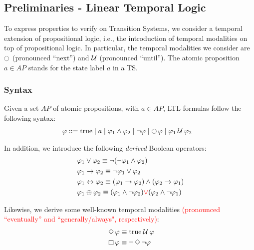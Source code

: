 \documentclass{article}
\begin{document}
\subsection{Preliminaries - Linear Temporal Logic}
\label{subsec-ltl}
To express properties to verify on Transition Systems, we consider a temporal extension of propositional logic, i.e., 
the introduction of temporal modalities on top of propositional logic. In particular, the temporal
modalities we consider are $\ocircle$ (pronounced ``next'') and $\mathbin{\mathcal{U}}$ (pronounced ``until'').
The atomic proposition $a \in AP$ stands for the state label $a$ in a TS.

\subsubsection*{Syntax}
Given a set $AP$ of atomic propositions, with $a \in AP$, LTL formulas follow the following syntax: 
\begin{align*}
    &\; \varphi ::= \text{true} \mid a \mid \varphi_1 \land \varphi_2 \mid \neg \varphi \mid \mathop{\ocircle}{\varphi} \mid \varphi_1 \mathbin{\mathcal{U}} \varphi_2
\end{align*}

In addition, we introduce the following \emph{derived} Boolean operators: 
\begin{align*}
    &\; \varphi_1 \lor \varphi_2 \equiv \neg (\neg \varphi_1 \land \varphi_2) \\
    &\; \varphi_1 \rightarrow \varphi_2 \equiv \neg \varphi_1 \lor \varphi_2 \\
    &\; \varphi_1 \leftrightarrow  \varphi_2 \equiv (\varphi_1 \rightarrow \varphi_2) \land (\varphi_2 \rightarrow \varphi_1) \\
    &\; \varphi_1 \oplus  \varphi_2 \equiv (\varphi_1 \land \neg \varphi_2) \textcolor{red}{\lor} (\varphi_2 \land \neg \varphi_1)\\
\end{align*}

Likewise, we derive some well-known temporal modalities \textcolor{red}{(pronounced ``eventually'' and ``generally/always", respectively)}:
\begin{align*}
    &\; \mathop{\Diamond} \varphi \equiv \text{true} \mathbin{\mathcal{U}} \varphi \\
    &\; \mathop{\square} \varphi \equiv \neg \mathop{\Diamond} \neg \varphi \\
\end{align*}
\end{document}
